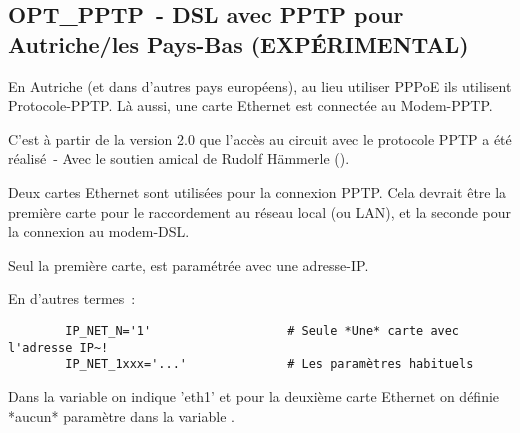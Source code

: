 \subsection {OPT\_PPTP~- DSL avec PPTP pour Autriche/les Pays-Bas (EXPÉRIMENTAL)}

En Autriche (et dans d'autres pays européens), au lieu utiliser
PPPoE ils utilisent Protocole-PPTP. Là aussi, une carte Ethernet
est connectée au Modem-PPTP.

C'est à partir de la version 2.0 que l'accès au circuit avec le protocole
PPTP a été réalisé~- Avec le soutien amical de Rudolf Hämmerle
().

Deux cartes Ethernet sont utilisées pour la connexion PPTP. Cela
devrait être la première carte pour le raccordement au réseau
local (ou LAN), et la seconde pour la connexion au modem-DSL.

Seul la première carte, est paramétrée avec une adresse-IP.

En d'autres termes~:

\begin{example}
\begin{verbatim}
        IP_NET_N='1'                   # Seule *Une* carte avec l'adresse IP~!
        IP_NET_1xxx='...'              # Les paramètres habituels
\end{verbatim}
\end{example}

Dans la variable  on indique 'eth1' et pour la deuxième carte
Ethernet on définie *aucun* paramètre dans la variable .

